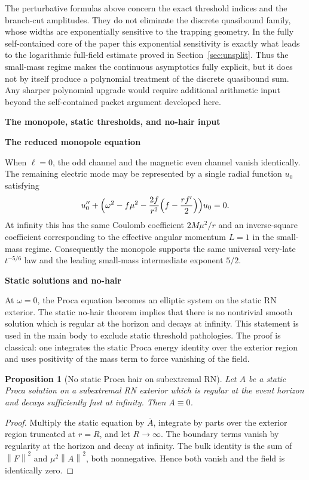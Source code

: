 \documentclass[12pt]{article}
\numberwithin{equation}{section}
\theoremstyle{plain}
\newtheorem{proposition}[theorem]{Proposition}
\theoremstyle{definition}
\theoremstyle{remark}
\newcommand{\om}{\omega}
\newcommand{\norm}[1]{\left\|#1\right\|}
\newcommand{\appheading}[1]{\par\medskip\noindent\textbf{#1}\par\smallskip\noindent}
\newcommand{\applabelheading}[2]{\par\medskip\phantomsection\label{#2}\noindent\textbf{#1}\par\smallskip\noindent}
\begin{document}
The perturbative formulas above concern the exact threshold indices and the branch-cut amplitudes.  They do not eliminate the discrete quasibound family, whose widths are exponentially sensitive to the trapping geometry.  In the fully self-contained core of the paper this exponential sensitivity is exactly what leads to the logarithmic full-field estimate proved in Section~\ref{sec:unsplit}.  Thus the small-mass regime makes the continuous asymptotics fully explicit, but it does not by itself produce a polynomial treatment of the discrete quasibound sum.  Any sharper polynomial upgrade would require additional arithmetic input beyond the self-contained packet argument developed here.

\applabelheading{The monopole, static thresholds, and no-hair input}{app:monopole}
\appheading{The reduced monopole equation}

When $\ell=0$, the odd channel and the magnetic even channel vanish identically.  The remaining electric mode may be represented by a single radial function $u_0$ satisfying
\[
   u_0''+\Bigl(\om^2-f\mu^2-\frac{2f}{r^2}\Bigl(f-\frac{rf'}2\Bigr)\Bigr)u_0=0.
\]
At infinity this has the same Coulomb coefficient $2M\mu^2/r$ and an inverse-square coefficient corresponding to the effective angular momentum $L=1$ in the small-mass regime.  Consequently the monopole supports the same universal very-late $t^{-5/6}$ law and the leading small-mass intermediate exponent $5/2$.

\appheading{Static solutions and no-hair}

At $\om=0$, the Proca equation becomes an elliptic system on the static RN exterior.  The static no-hair theorem implies that there is no nontrivial smooth solution which is regular at the horizon and decays at infinity.  This statement is used in the main body to exclude static threshold pathologies.  The proof is classical: one integrates the static Proca energy identity over the exterior region and uses positivity of the mass term to force vanishing of the field.

\begin{proposition}[No static Proca hair on subextremal RN]\label{prop:no_static_hair_appendix}
Let $A$ be a static Proca solution on a subextremal RN exterior which is regular at the event horizon and decays sufficiently fast at infinity.  Then $A\equiv0$.
\end{proposition}

\begin{proof}
Multiply the static equation by $\overline A$, integrate by parts over the exterior region truncated at $r=R$, and let $R\to\infty$.  The boundary terms vanish by regularity at the horizon and decay at infinity.  The bulk identity is the sum of $\norm{F}^2$ and $\mu^2\norm{A}^2$, both nonnegative.  Hence both vanish and the field is identically zero.
\end{proof}
\end{document}
